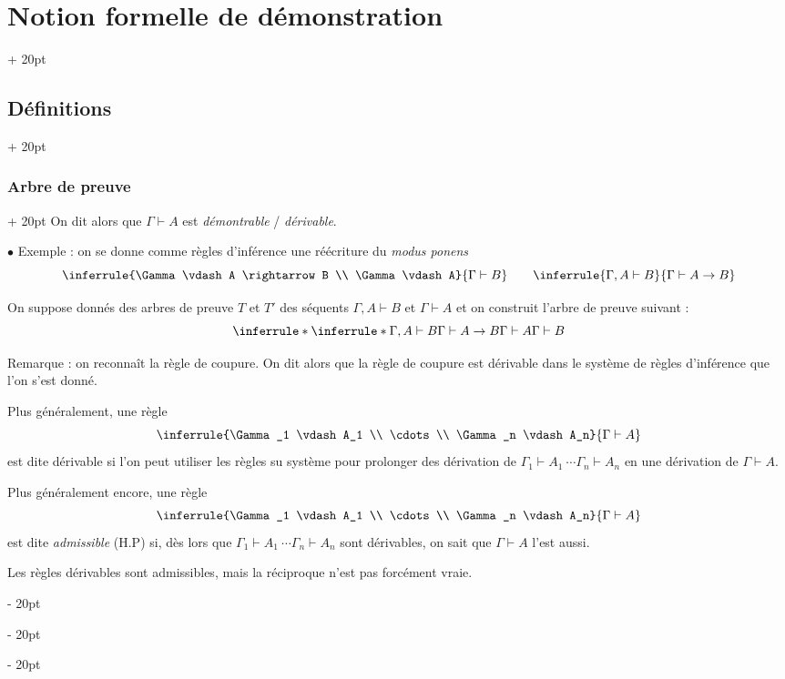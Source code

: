 \documentclass[a4paper, 12pt, twoside]{article}
\newcommand{\ind}[1][20pt]{\advance\leftskip + #1}
\newcommand{\deind}[1][20pt]{\advance\leftskip - #1}
\newenvironment{indt}[2][20pt]{#2 \par \ind[#1]}{\par \deind} %
\begin{document}
\begin{indt}{\section{Notion formelle de démonstration}}
\begin{indt}{\subsection{Définitions}}
\begin{indt}{\subsubsection{Arbre de preuve}}
                On dit alors que $\Gamma \vdash A$ est \emph{démontrable} / \emph{dérivable}.

                \vspace{12pt}
                
                $\bullet$ Exemple : on se donne comme règles d'inférence une réécriture du \textit{modus ponens}
                \[
                    \inferrule{\Gamma \vdash A \rightarrow B \\ \Gamma \vdash A}{\Gamma \vdash B}
                    \qquad
                    \inferrule{\Gamma, A \vdash B}{\Gamma \vdash A \rightarrow B}
                \]

                On suppose donnés des arbres de preuve $T$ et $T'$ des séquents $\Gamma, A \vdash B$ et $\Gamma \vdash A$ et on construit l'arbre de preuve suivant :
                \[
                    \inferrule*
                    {
                        \inferrule*{\Gamma, A \vdash B}{\Gamma \vdash A \rightarrow B}
                        \\
                        \Gamma \vdash A
                    }
                    {\Gamma \vdash B}
                \]

                \vspace{6pt}
                
                Remarque : on reconnaît la règle de coupure. On dit alors que la règle de coupure est dérivable dans le système de règles d'inférence que l'on s'est donné.

                Plus généralement, une règle
                \[
                    \inferrule{\Gamma_1 \vdash A_1 \\ \cdots \\ \Gamma_n \vdash A_n}{\Gamma \vdash A}
                \]
                est dite dérivable si l'on peut utiliser les règles su système pour prolonger des dérivation de $\Gamma_1 \vdash A_1\ \cdots \Gamma_n \vdash A_n$ en une dérivation de $\Gamma \vdash A$.

                Plus généralement encore, une règle
                \[
                    \inferrule{\Gamma_1 \vdash A_1 \\ \cdots \\ \Gamma_n \vdash A_n}{\Gamma \vdash A}
                \]
                est dite \emph{admissible} (H.P) si, dès lors que $\Gamma_1 \vdash A_1\ \cdots \Gamma_n \vdash A_n$ sont dérivables, on sait que $\Gamma \vdash A$ l'est aussi.

                Les règles dérivables sont admissibles, mais la réciproque n'est pas forcément vraie.


\end{indt}
\end{indt}
\end{indt}
\end{document}
